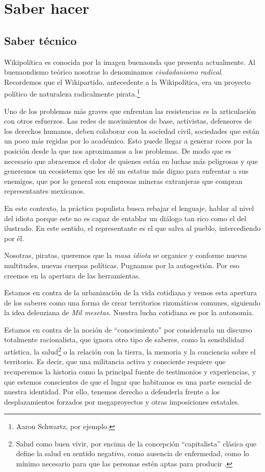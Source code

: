 \hypertarget{saber-hacer}{%
\section{Saber hacer}}\label{saber-hacer}

\hypertarget{saber-tuxe9cnico}{%
\subsection{Saber técnico}\label{saber-tecnico}}

Wikipolítica es conocida por la imagen buenaonda que presenta
actualmente. Al buenaondismo teórico nosotras lo denominamos
\emph{ciudadanismo radical}. Recordemos que el Wikipartido, antecedente
a la Wikipolítica, era un proyecto político de naturaleza radicalmente
pirata.\footnote{Aaron Schwartz, por ejemplo.}

Uno de los problemas más graves que enfrentan las resistencias es la
articulación con otros esfuerzos. Las redes de movimientos de base,
activistas, defensores de los derechos humanos, deben colaborar con la
sociedad civil, sociedades que están un poco más regidas por lo
académico. Esto puede llegar a generar roces por la posición desde la
que nos aproximamos a los problemas. De modo que es necesario que
abracemos el dolor de quienes están en luchas más peligrosas y que
generemos un ecosistema que les dé un estatus más digno para enfrentar a
sus enemigos, que por lo general son empresas mineras extranjeras que
compran representantes mexicanos.

En este contexto, la práctica populista busca rebajar el lenguaje,
hablar al nivel del idiota porque este no es capaz de entablar un
diálogo tan rico como el del ilustrado. En este sentido, el
representante es el que salva al pueblo, intercediendo por él.

Nosotras, piratas, queremos que la \emph{masa idiota} se organice y
conforme nuevas multitudes, nuevas cuerpas políticas. Pugnamos por la
autogestión. Por eso creemos en la apertura de las herramientas.

Estamos en contra de la urbanización de la vida cotidiana y vemos esta
apertura de los saberes como una forma de crear territorios rizomáticos
comunes, siguiendo la idea deleuziana de \emph{Mil mesetas.} Nuestra
lucha cotidiana es por la autonomía.

Estamos en contra de la noción de ``conocimiento'' por considerarla un
discurso totalmente racionalista, que ignora otro tipo de saberes, como
la sensibilidad artística, la salud\footnote{Salud como buen vivir, por
  encima de la concepción ``capitalista'' clásica que define la salud en
  sentido negativo, como ausencia de enfermedad, como lo mínimo
  necesario para que las personas estén aptas para
  producir \cite{Balch2013}.} o la relación con la
tierra, la memoria y la conciencia sobre el territorio. Es decir, que
una militancia activa y consciente requiere que recuperemos la historia
como la principal fuente de testimonios y experiencias, y que estemos
conscientes de que el lugar que habitamos es una parte esencial de
nuestra identidad. Por ello, tenemos derecho a defenderla frente a los
desplazamientos forzados por megaproyectos y otras imposiciones
estatales.

